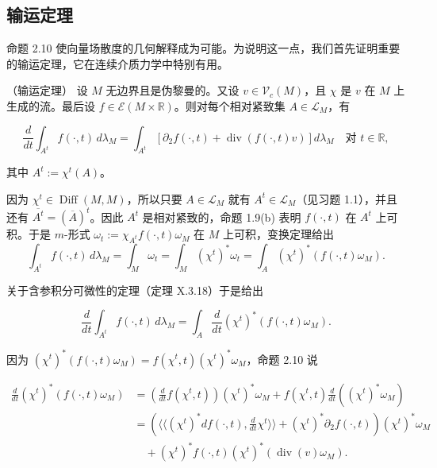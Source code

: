 \subsection*{输运定理}

命题 2.10 使向量场散度的几何解释成为可能。为说明这一点，我们首先证明重要的输运定理，它在连续介质力学中特别有用。

\begin{theorem}

（输运定理） 设 $ M $ 无边界且是伪黎曼的。又设 $ v \in \mathcal{V}_c(M) $，且 $ \chi $ 是 $ v $ 在 $ M $ 上生成的流。最后设 $ f \in \mathcal{E}(M \times \mathbb{R}) $。则对每个相对紧致集 $ A \in \mathcal{L}_M $，有

\[
\frac{d}{dt}\int_{A^t} f(\cdot,t)\,d\lambda_M = \int_{A^t}\left[\partial_2 f(\cdot,t) + \operatorname{div}(f(\cdot,t)v)\right] d\lambda_M \quad \text{对 } t \in \mathbb{R} ,
\]

其中 $ A^t := \chi^t(A) $。

\proofhead
因为 $ \chi^t \in \operatorname{Diff}(M,M) $，所以只要 $ A \in \mathcal{L}_M $ 就有 $ A^t \in \mathcal{L}_M $（见习题 1.1），并且还有 $ \overline{A^t} = (\overline{A})^t $。因此 $ A^t $ 是相对紧致的，命题 1.9(b) 表明 $ f(\cdot,t) $ 在 $ A^t $ 上可积。于是 $ m $-形式 $ \omega_t := \chi_{A^t} f(\cdot,t)\omega_M $ 在 $ M $ 上可积，变换定理给出
\[
\int_{A^t} f(\cdot,t)\,d\lambda_M = \int_M \omega_t = \int_M (\chi^t)^*\omega_t = \int_A (\chi^t)^*(f(\cdot,t)\omega_M) .
\]

关于含参积分可微性的定理（定理 X.3.18）于是给出

\begin{equation}
\frac{d}{dt}\int_{A^t} f(\cdot,t)\,d\lambda_M = \int_A \frac{d}{dt}(\chi^t)^*(f(\cdot,t)\omega_M) .\tag{2.33}
\end{equation}

因为 $ (\chi^t)^*(f(\cdot,t)\omega_M) = f(\chi^t,t)(\chi^t)^*\omega_M $，命题 2.10 说

\begin{equation*}
\begin{aligned}
\frac{d}{dt}(\chi^t)^*(f(\cdot,t)\omega_M) &= \left(\frac{d}{dt}f(\chi^t,t)\right)(\chi^t)^*\omega_M + f(\chi^t,t)\frac{d}{dt}\left((\chi^t)^*\omega_M\right) \\ &= \left(\langle\langle (\chi^t)^* df(\cdot,t), \frac{d}{dt}\chi^t \rangle\rangle + (\chi^t)^*\partial_2 f(\cdot,t)\right)(\chi^t)^*\omega_M \\ &\quad + (\chi^t)^* f(\cdot,t)(\chi^t)^*(\operatorname{div}(v)\omega_M) .
\end{aligned}
\end{equation*}


\end{theorem}
